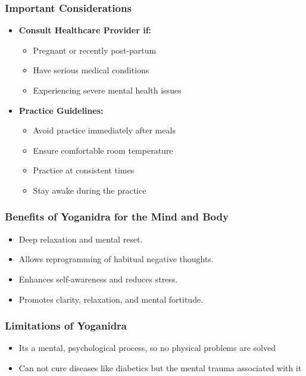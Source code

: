 \begin{frame}[fragile]\frametitle{Important Considerations}
    \begin{itemize}
        \item \textbf{Consult Healthcare Provider if:}
        \begin{itemize}
            \item Pregnant or recently post-partum
            \item Have serious medical conditions
            \item Experiencing severe mental health issues
        \end{itemize}
        \item \textbf{Practice Guidelines:}
        \begin{itemize}
            \item Avoid practice immediately after meals
            \item Ensure comfortable room temperature
            \item Practice at consistent times
            \item Stay awake during the practice
        \end{itemize}
    \end{itemize}
\end{frame}

\begin{frame}[fragile]\frametitle{Benefits of Yoganidra for the Mind and Body}
    \begin{itemize}
        \item Deep relaxation and mental reset.
        \item Allows reprogramming of habitual negative thoughts.
        \item Enhances self-awareness and reduces stress.
        \item Promotes clarity, relaxation, and mental fortitude.
    \end{itemize}
\end{frame}

\begin{frame}[fragile]\frametitle{Limitations of Yoganidra}
    \begin{itemize}
        \item Its a mental, psychological process, so no physical problems are solved
		\item Can not cure diseases like diabetics but the mental trauma associated with it
    \end{itemize}
\end{frame}


